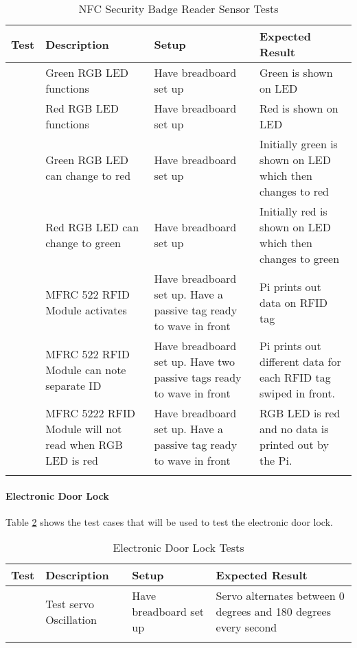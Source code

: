 \begin{longtable}[htb]{>{\centering\arraybackslash}m{0.75cm}|>{\centering\arraybackslash}m{4cm}|>{\centering\arraybackslash}m{4.5cm}|>{\centering\arraybackslash}m{4cm}}
\toprule
Test & Description & Setup & Expected Result \\
\midrule
1 & Green RGB LED functions & Have breadboard set up & Green is shown on LED \\
\hline
2 & Red RGB LED functions & Have breadboard set up & Red is shown on LED \\
\hline
3 & Green RGB LED can change to red & Have breadboard set up & Initially green
is shown on LED which then changes to red \\
\hline
4 & Red RGB LED can change to green & Have breadboard set up & Initially red is
shown on LED which then changes to green \\
\hline
5 & MFRC 522 RFID Module activates & Have breadboard set up. Have a passive tag
ready to wave in front & Pi prints out data on RFID tag \\
\hline
6 & MFRC 522 RFID Module can note separate ID & Have breadboard set up. Have two
passive tags ready to wave in front & Pi prints out different data for each RFID
tag swiped in front. \\
\hline
7 & MFRC 5222 RFID Module will not read when RGB LED is red & Have breadboard
set up. Have a passive tag ready to wave in front & RGB LED is red and no data
is printed out by the Pi. \\
\bottomrule
\caption{NFC Security Badge Reader Sensor Tests}
\label{table:nfc-tests}
\end{longtable}

\paragraph{Electronic Door Lock}

Table \ref{table:servo-tests} shows the test cases that will be used to test the
electronic door lock.

\begin{longtable}[htb]{>{\centering\arraybackslash}m{0.75cm}|>{\centering\arraybackslash}m{4cm}|>{\centering\arraybackslash}m{4.5cm}|>{\centering\arraybackslash}m{4cm}}
\toprule
Test & Description & Setup & Expected Result \\
\midrule
1 & Test servo Oscillation & Have breadboard set up & Servo alternates between
0 degrees and 180 degrees every second \\
\bottomrule
\caption{Electronic Door Lock Tests}
\label{table:servo-tests}
\end{longtable}

